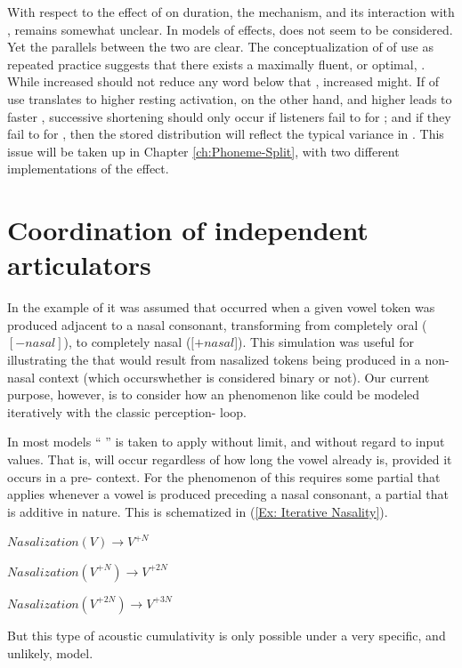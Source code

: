 With respect to the effect of  on duration, the mechanism,
and its interaction with , remains somewhat unclear.
In models of  effects,  does not seem to be
considered. Yet the parallels between the two are clear. The conceptualization
of  of use as repeated practice suggests that there exists
a maximally fluent, or optimal,  . While increased
 should not reduce any word below that , increased
 might. If  of use translates to higher resting
activation, on the other hand, and higher  leads
to faster , successive shortening should only occur if listeners
fail to  for ; and if they fail to 
for , then the stored distribution will reflect the typical
variance in . This issue will be taken up in Chapter
\ref{ch:Phoneme-Split}, with two different implementations of the
 effect.

\section{Coordination of independent articulators}

In the  example of 
it was assumed that  occurred when a given vowel token
was produced adjacent to a nasal consonant, transforming from completely
oral ($[-nasal]$), to completely nasal ($[+nasal${]}). This simulation
was useful for illustrating the  that would result
from nasalized tokens being produced in a non-nasal context (which
occurs\linebreak whether  is considered binary or not). Our current
purpose, however, is to consider how an  phenomenon like
 could be modeled iteratively with the classic perception-
loop. 

In most  models `` '' is taken to apply without
limit, and without regard to input values. That is,  will
occur regardless of how long the vowel already is, provided it occurs
in a pre- context. For the phenomenon of 
this requires some partial  that applies whenever a vowel
is produced preceding a nasal consonant, a partial  that
is additive in nature. This is schematized in (\ref{Ex: Iterative Nasality}). 
\begin{covexample}
\label{Ex: Iterative Nasality}$\textit{Nasalization}(V)\rightarrow V^{+N}$

$\textit{Nasalization}(V^{+N})\rightarrow V^{+2N}$

$\textit{Nasalization}(V^{+2N})\rightarrow V^{+3N}$
\end{covexample}
But this type of acoustic cumulativity is only possible under a very
specific, and unlikely,  model. 

